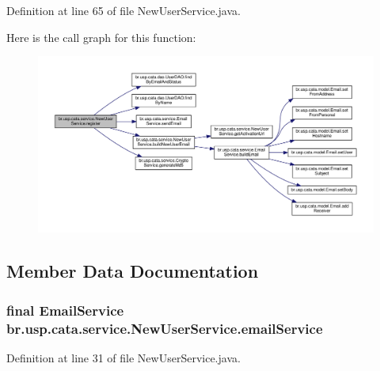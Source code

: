 Definition at line 65 of file New\+User\+Service.\+java.



Here is the call graph for this function\+:\nopagebreak
\begin{figure}[H]
\begin{center}
\leavevmode
\includegraphics[width=350pt]{classbr_1_1usp_1_1cata_1_1service_1_1_new_user_service_a931ce40045ffd8a9a0f1b3fc152d71fc_cgraph}
\end{center}
\end{figure}




\subsection{Member Data Documentation}
\hypertarget{classbr_1_1usp_1_1cata_1_1service_1_1_new_user_service_afd564835d3b82f748745b6c899175c1f}{
\subsubsection[{email\+Service}]{\setlength{\rightskip}{0pt plus 5cm}final {\bf Email\+Service} br.\+usp.\+cata.\+service.\+New\+User\+Service.\+email\+Service\hspace{0.3cm}{\ttfamily [private]}}}\label{classbr_1_1usp_1_1cata_1_1service_1_1_new_user_service_afd564835d3b82f748745b6c899175c1f}


Definition at line 31 of file New\+User\+Service.\+java.

